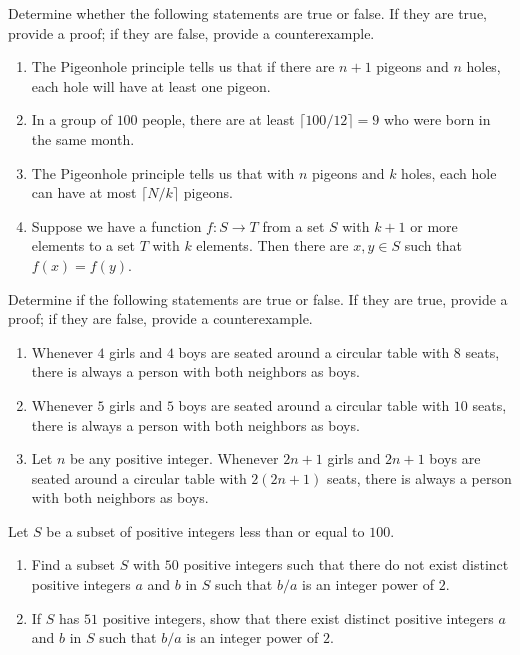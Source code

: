 \documentclass[../main.tex]{subfiles}
\begin{document}
\begin{homework}
    Determine whether the following statements are true or false. If they are true, provide a proof; if they are false, provide a counterexample. 
    \begin{enumerate}[label=(\alph*)]
        \item The Pigeonhole principle tells us that if there are $n+1$ pigeons and $n$ holes, each hole will have at least one pigeon.
        \item In a group of $100$ people, there are at least $\lceil 100/12 \rceil = 9$ who were born in the same month.  
        \item The Pigeonhole principle tells us that with $n$ pigeons and $k$ holes, each hole can have at most $\lceil N/k \rceil$ pigeons.
        \item Suppose we have a function $f\colon S\to T$ from a set $S$ with $k+1$ or more elements to a set $T$ with $k$ elements. Then there are $x,y\in S$ such that $f(x)=f(y)$.
    \end{enumerate}
\end{homework}

\begin{homework}
    Determine if the following statements are true or false. If they are true, provide a proof; if they are false, provide a counterexample.
    \begin{enumerate}[label=(\alph*)]
        \item Whenever $4$ girls and $4$ boys are seated around a circular table with $8$ seats, there is always a person with both neighbors as boys.
        \item Whenever $5$ girls and $5$ boys are seated around a circular table with $10$ seats, there is always a person with both neighbors as boys.
        \item Let $n$ be any positive integer. Whenever $2n+1$ girls and $2n+1$ boys are seated around a circular table with $2(2n+1)$ seats, there is always a person with both neighbors as boys.
    \end{enumerate}
\end{homework}

\begin{homework}
    Let $S$ be a subset of positive integers less than or equal to $100$.
    \begin{enumerate}[label=(\alph*)]
        \item Find a subset $S$ with $50$ positive integers such that there do not exist distinct positive integers $a$ and $b$ in $S$ such that $b/a$ is an integer power of $2$.
        \item If $S$ has $51$ positive integers, show that there exist distinct positive integers $a$ and $b$ in $S$ such that $b/a$ is an integer power of $2$.
    \end{enumerate}
\end{homework}
\end{document}
